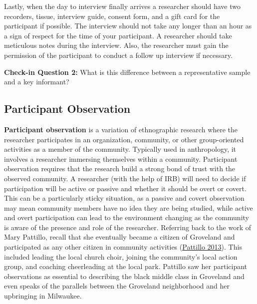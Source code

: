 \documentclass{book}
\newenvironment{shaded*}{
    \begin{center}
    \begin{tabular}{|p{0.9\textwidth}|}
    \hline\\
    }
    { 
    \\\\\hline
    \end{tabular} 
    \end{center}
}
\begin{document}
Lastly, when the day to interview finally arrives a researcher should have two
recorders, tissue, interview guide, consent form, and a gift card for the
participant if possible. The interview should not take any longer than an hour
as a sign of respect for the time of your participant. A researcher should
take meticulous notes during the interview. Also, the researcher must gain the
permission of the participant to conduct a follow up interview if necessary.

\begin{shaded*}

\textbf{Check-in Question 2:} What is this difference between a representative
sample and a key informant?

\end{shaded*}

\hypertarget{participant-observation}{%
\subsection{Participant Observation}\label{participant-observation}}

\textbf{Participant observation} is a variation of ethnographic research where
the researcher participates in an organization, community, or other
group-oriented activities as a member of the community. Typically used in
anthropology, it involves a researcher immersing themselves within a
community. Participant observation requires that the research build a strong
bond of trust with the observed community. A researcher (with the help of IRB)
will need to decide if participation will be active or passive and whether it
should be overt or covert. This can be a particularly sticky situation, as a
passive and covert observation may mean community members have no idea they
are being studied, while active and overt participation can lead to the
environment changing as the community is aware of the presence and role of the
researcher. Referring back to the work of Mary Pattillo, recall that she
eventually became a citizen of Groveland and participated as any other citizen
in community activities (\protect\hyperlink{ref-pattillo2013a}{Pattillo
2013}). This included leading the local church choir, joining the community's
local action group, and coaching cheerleading at the local park. Pattillo saw
her participant observations as essential to describing the black middle class
in Groveland and even speaks of the parallels between the Groveland
neighborhood and her upbringing in Milwaukee.
\end{document}
